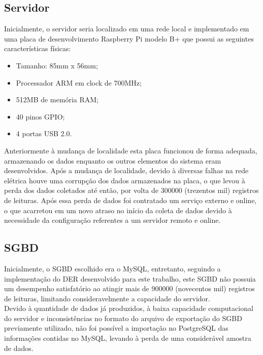 \subsection{Servidor}
\quad Inicialmente, o servidor seria localizado em uma rede local e implementado em uma placa de desenvolvimento Raspberry Pi modelo B+ que possui as seguintes características físicas:
\begin{itemize}
  \item Tamanho: 85mm x 56mm;
  \item Processador ARM em clock de 700MHz;
  \item 512MB de memória RAM;
  \item 40 pinos GPIO;
  \item 4 portas USB 2.0.
\end{itemize}
\null\quad Anteriormente à mudança de localidade esta placa funcionou de forma adequada, armazenando os dados enquanto os outros elementos do sistema eram desenvolvidos. Após a mudança de localidade, devido à diversas falhas na rede elétrica houve uma corrupção dos dados armazenados na placa, o que levou à perda dos dados coletados até então, por volta de 300000 (trezentos mil) registros de leituras. Após essa perda de dados foi contratado um serviço externo e online, o que acarretou em um novo atraso no início da coleta de dados devido à necessidade da configuração referentes a um servidor remoto e online.

\subsection{\acrlong{SGBD}}
\quad Inicialmente, o \acrshort{SGBD} escolhido era o MySQL, entretanto, seguindo a implementação do \acrshort{DER} desenvolvido para este trabalho, este \acrlong{SGBD} não possuia um desempenho satisfatório ao atingir mais de 900000 (novecentos mil) registros de leituras, limitando consideravelmente a capacidade do servidor.
\\\null \quad Devido à quantidade de dados já produzidos, à baixa capacidade computacional do servidor e inconsistências no formato do arquivo de exportação do \acrshort{SGBD} previamente utilizado, não foi possível a importação no PostgreSQL das informações contidas no MySQL, levando à perda de uma considerável amostra de dados.
